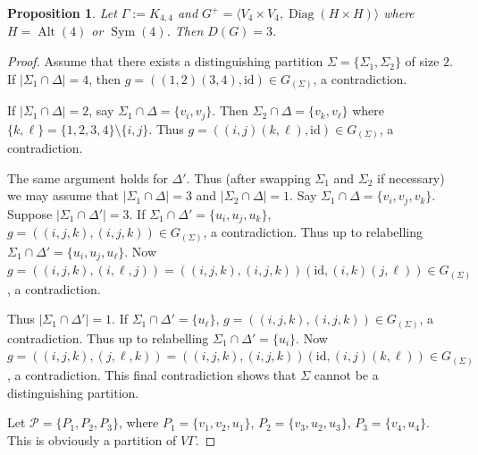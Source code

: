 \documentclass[11pt]{amsart}
\newtheorem{proposition}[theorem]{Proposition}
\DeclareMathOperator{\Sym}{Sym}
\DeclareMathOperator{\Alt}{Alt}
\DeclareMathOperator{\Diag}{Diag}
\begin{document}



\begin{proposition}\label{prop:n=4}
Let \(\Gamma:=K_{4,4}\) and \(G^+=\langle V_4\times V_4, \Diag(H \times H)\rangle\)  where $H=\Alt(4)$ or $\Sym(4)$. Then \(D(G)=3\).
\end{proposition} 
\begin{proof}


Assume that there exists a distinguishing partition $ \Sigma = \{\Sigma_1,\Sigma_2\}$ of size $2$.
If $|\Sigma_1\cap \Delta|=4$, then $g=((1,2)(3,4),\mathrm{id})\in G_{(\Sigma)}$, a contradiction.

If $|\Sigma_1\cap \Delta|=2$, say $\Sigma_1\cap \Delta=\{v_i,v_j\}$. Then $\Sigma_2\cap \Delta=\{v_k,v_\ell\}$ where $\{k,\ell\}=\{1,2,3,4\}\setminus \{i,j\}$. Thus $g=((i,j)(k,\ell),\mathrm{id})\in G_{(\Sigma)}$, a contradiction.

The same argument holds for $\Delta'$. Thus (after swapping $\Sigma_1$ and $\Sigma_2$ if necessary) we may assume that $|\Sigma_1\cap \Delta|=3$ and $|\Sigma_2\cap \Delta| =1$.
Say  $\Sigma_1\cap \Delta=\{v_i,v_j,v_k\}$. Suppose  $|\Sigma_1\cap \Delta'|=3$. If $\Sigma_1\cap \Delta'=\{u_i,u_j,u_k\}$,  $g=((i,j,k),(i,j,k))\in G_{(\Sigma)}$, a contradiction. Thus up to relabelling $\Sigma_1\cap \Delta'=\{u_i,u_j,u_\ell\}$. Now 
$g=((i,j,k),(i,\ell,j))=((i,j,k),(i,j,k))(\mathrm{id},(i,k)(j,\ell))\in G_{(\Sigma)}$, a contradiction.

Thus $|\Sigma_1\cap \Delta'|=1$. If $\Sigma_1\cap \Delta'=\{u_\ell\}$,  $g=((i,j,k),(i,j,k))\in G_{(\Sigma)}$, a contradiction. 
 Thus up to relabelling $\Sigma_1\cap \Delta'=\{u_i\}$. Now 
$g=((i,j,k),(j,\ell,k))=((i,j,k),(i,j,k))(\mathrm{id},(i,j)(k,\ell))\in G_{(\Sigma)}$, a contradiction.
This final contradiction shows that $\Sigma$ cannot be a distinguishing partition.




Let $\mathcal P = \{P_1,P_2,P_{3}\}$, where $P_1=\{v_1,v_2,u_1\}$, $P_2=\{v_3,u_2,u_3\}$, $P_3=\{v_4,u_4\}$.
This is obviously a partition of $V\Gamma$.


\end{proof}
\end{document}
